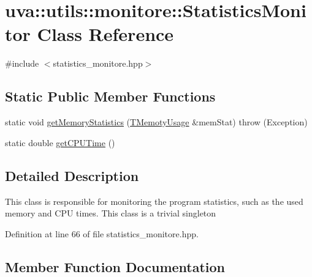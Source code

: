 \hypertarget{classuva_1_1utils_1_1monitore_1_1_statistics_monitor}{}\section{uva\+:\+:utils\+:\+:monitore\+:\+:Statistics\+Monitor Class Reference}
\label{classuva_1_1utils_1_1monitore_1_1_statistics_monitor}


{\ttfamily \#include $<$statistics\+\_\+monitore.\+hpp$>$}

\subsection*{Static Public Member Functions}
\begin{DoxyCompactItemize}
\item 
static void \hyperlink{classuva_1_1utils_1_1monitore_1_1_statistics_monitor_a12b52cb3e94cf0c21dba5bad034ed7d1}{get\+Memory\+Statistics} (\hyperlink{namespaceuva_1_1utils_1_1monitore_ac0df0397adabb51dc8e620649541e891}{T\+Memoty\+Usage} \&mem\+Stat)  throw (\+Exception)
\item 
static double \hyperlink{classuva_1_1utils_1_1monitore_1_1_statistics_monitor_a85b7c8186ab6331e64a12c67991c6d15}{get\+C\+P\+U\+Time} ()
\end{DoxyCompactItemize}


\subsection{Detailed Description}
This class is responsible for monitoring the program statistics, such as the used memory and C\+P\+U times. This class is a trivial singleton 

Definition at line 66 of file statistics\+\_\+monitore.\+hpp.



\subsection{Member Function Documentation}
\hypertarget{classuva_1_1utils_1_1monitore_1_1_statistics_monitor_a85b7c8186ab6331e64a12c67991c6d15}{}
